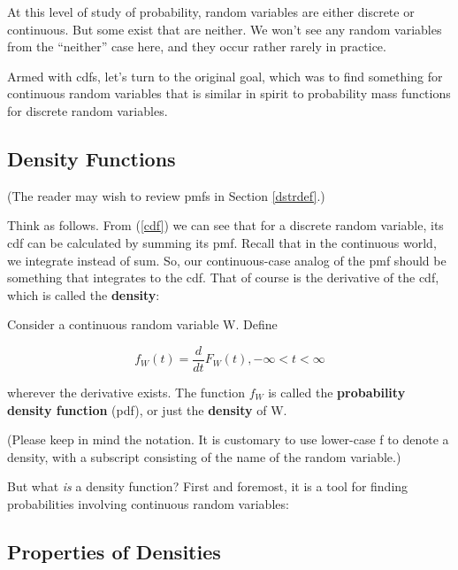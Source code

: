 At this level of study of probability, random variables are either
discrete or continuous.  But some exist that are neither.  We won't see
any random variables from the ``neither'' case here, and they occur
rather rarely in practice.

Armed with cdfs, let's turn to the original goal, which was to find
something for continuous random variables that is similar in spirit to
probability mass functions for discrete random variables.

\subsection{Density Functions}
\label{densitymotivation}

{}

(The reader may wish to review pmfs in Section \ref{dstrdef}.)

Think as follows.  From (\ref{cdf}) we can see that for a discrete
random variable, its cdf can be calculated by summing its pmf.  Recall
that in the continuous world, we integrate instead of sum.
So, our continuous-case analog of the pmf should be
something that integrates to the cdf.  That of course is the derivative
of the cdf, which is called the {\bf density}:  

\begin{definition} 
Consider a continuous random variable W.  Define

\begin{equation}
\label{dens}
f_W(t) = \frac{d}{dt} F_W(t), -\infty < t < \infty
\end{equation}

wherever the derivative exists.  The function $f_W$ is called the {\bf
probability density function} (pdf), or just the {\bf density} of W.
\end{definition}

(Please keep in mind the notation.  It is customary to use lower-case f
to denote a density, with a subscript consisting of the name of the
random variable.)

But what {\it is} a density function?  First and foremost, it is a tool
for finding probabilities involving continuous random variables:

\subsection{Properties of Densities}

